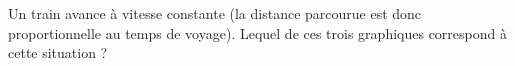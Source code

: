 
\begin{exercice}\label{exo2smath-0096}

    Un train avance à vitesse constante (la distance parcourue est donc proportionnelle au temps de voyage). Lequel de ces trois graphiques correspond à cette situation ?

\begin{center}
   
   
   
\end{center}

\end{exercice}
